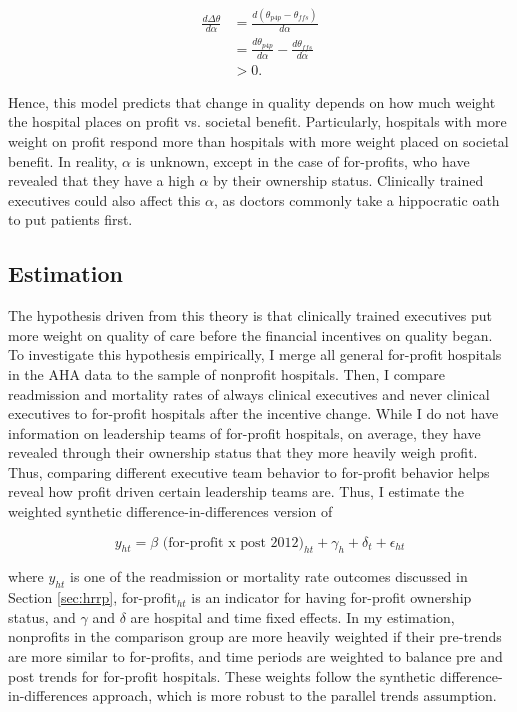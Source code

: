 \documentclass[12pt]{article}
\begin{document}
    \begin{align*}
        \frac{d\Delta\theta}{d\alpha}&=\frac{d(\theta_{p4p}-\theta_{ffs})}{d\alpha}\\
        &=\frac{d\theta_{p4p}}{d\alpha}-\frac{d\theta_{ffs}}{d\alpha}\\
        &> 0.
    \end{align*}


    Hence, this model predicts that change in quality depends on how much weight the hospital places on profit vs. societal benefit. Particularly, hospitals with more weight on profit respond more than hospitals with more weight placed on societal benefit. In reality, $\alpha$ is unknown, except in the case of for-profits, who have revealed that they have a high $\alpha$ by their ownership status. Clinically trained executives could also affect this $\alpha$, as doctors commonly take a hippocratic oath to put patients first. 

    \subsection{Estimation}


    The hypothesis driven from this theory is that clinically trained executives put more weight on quality of care before the financial incentives on quality began. To investigate this hypothesis empirically, I merge all general for-profit hospitals in the AHA data to the sample of nonprofit hospitals. Then, I compare readmission and mortality rates of always clinical executives and never clinical executives to for-profit hospitals after the incentive change. While I do not have information on leadership teams of for-profit hospitals, on average, they have revealed through their ownership status that they more heavily weigh profit. Thus, comparing different executive team behavior to for-profit behavior helps reveal how profit driven certain leadership teams are. Thus, I estimate the weighted synthetic difference-in-differences version of

    \begin{equation}
    \label{eq:forprofit}
    y_{ht} = \beta \text{ (for-profit x post 2012)}_{ht} + \gamma_{h} + \delta_t + \epsilon_{ht}
    \end{equation}

    \noindent where $y_{ht}$ is one of the readmission or mortality rate outcomes discussed in Section \ref{sec:hrrp}, for-profit$_{ht}$ is an indicator for having for-profit ownership status, and $\gamma$ and $\delta$ are hospital and time fixed effects. In my estimation, nonprofits in the comparison group are more heavily weighted if their pre-trends are more similar to for-profits, and time periods are weighted to balance pre and post trends for for-profit hospitals. These weights follow the synthetic difference-in-differences approach, which is more robust to the parallel trends assumption. 
    
\end{document}
